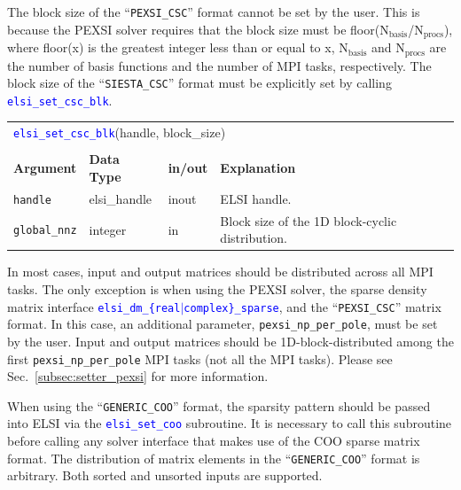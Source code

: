 \documentclass{report}
\newcommand{\api}[1]{\textcolor{blue}{\texttt{#1}}}
\begin{document}
The block size of the ``\texttt{PEXSI\_CSC}'' format cannot be set by the user. This is because the PEXSI solver requires that the block size must be floor($\text{N}_\text{basis}$/$\text{N}_\text{procs}$), where floor(x) is the greatest integer less than or equal to x, $\text{N}_\text{basis}$ and $\text{N}_\text{procs}$ are the number of basis functions and the number of MPI tasks, respectively. The block size of the ``\texttt{SIESTA\_CSC}'' format must be explicitly set by calling \api{elsi\_set\_csc\_blk}.

\begin{tabular}[]{|p{20mm}|p{20mm}|p{10mm}|p{112mm}|}
\multicolumn{4}{l}{\api{elsi\_set\_csc\_blk}(handle, block\_size)}\\
\multicolumn{4}{l}{}\\
\hline
\multicolumn{1}{|l|}{\textbf{Argument}} & \multicolumn{1}{l|}{\textbf{Data Type}} & \multicolumn{1}{l|}{\textbf{in/out}} & \multicolumn{1}{l|}{\textbf{Explanation}}\\
\hline
\texttt{handle}      & elsi\_handle & inout & ELSI handle.\\
\hline
\texttt{global\_nnz} & integer      & in    & Block size of the 1D block-cyclic distribution.\\
\hline
\end{tabular}

In most cases, input and output matrices should be distributed across all MPI tasks. The only exception is when using the PEXSI solver, the sparse density matrix interface \api{elsi\_dm\_\{real$\vert$complex\}\_sparse}, and the ``\texttt{PEXSI\_CSC}'' matrix format. In this case, an additional parameter, \texttt{pexsi\_np\_per\_pole}, must be set by the user. Input and output matrices should be 1D-block-distributed among the first \texttt{pexsi\_np\_per\_pole} MPI tasks (not all the MPI tasks). Please see Sec.~\ref{subsec:setter_pexsi} for more information.

When using the ``\texttt{GENERIC\_COO}'' format, the sparsity pattern should be passed into ELSI via the \api{elsi\_set\_coo} subroutine. It is necessary to call this subroutine before calling any solver interface that makes use of the COO sparse matrix format. The distribution of matrix elements in the ``\texttt{GENERIC\_COO}'' format is arbitrary. Both sorted and unsorted inputs are supported.
\end{document}
